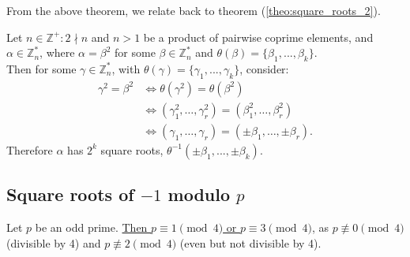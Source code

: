 \newpage
\noindent
From the above theorem, we relate back to theorem (\ref{theo:square_roots_2}).
\begin{theo}

    Let $n\in\mathbb{Z}^+:2\nmid n$ and $n>1$ be a product of pairwise coprime elements, and $\alpha\in\mathbb{Z}_n^*$, where $\alpha = \beta^2$ for some $\beta\in\mathbb{Z}_n^*$ and $\theta(\beta)=\{\beta_1,...,\beta_k\}$.\\
    
    \noindent
    Then for some $\gamma\in\mathbb{Z}_n^*$, with $\theta(\gamma)=\{\gamma_1,...,\gamma_k\}$, consider:
    \begin{align*}
        \gamma^2 = \beta^2 &\iff \theta(\gamma^2) = \theta(\beta^2) \\
        &\iff (\gamma_1^2, \dots, \gamma_r^2) = (\beta_1^2, \dots, \beta_r^2) \\
        &\iff (\gamma_1, \dots, \gamma_r) = (\pm \beta_1, \dots, \pm \beta_r).
        \end{align*}
    \noindent
    Therefore $\alpha$ has $2^k$ square roots, $\theta^{-1}(\pm\beta_1,...,\pm\beta_k)$.

\end{theo}

\subsection {Square roots of $-1$ modulo $p$}

\begin{theo}


    \label{theo:primes_1_3}

    Let $p$ be an odd prime. \underline{Then $p\equiv 1\pmod{4}$ or $p\equiv 3\pmod{4}$,} as $p\not\equiv 0\pmod{4}$ (divisible by 4) and $p\not\equiv 2\pmod{4}$ (even but not divisible by 4).
\end{theo}


